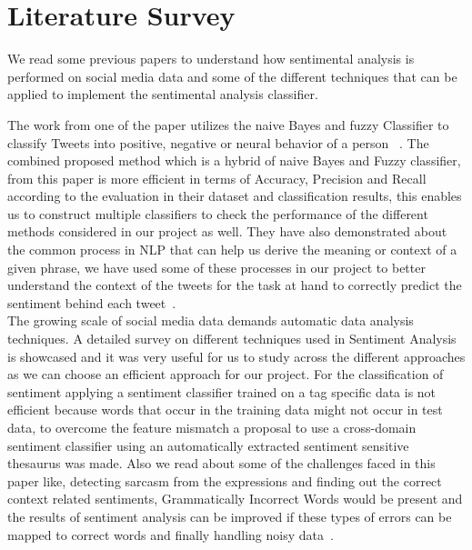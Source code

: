 \section{Literature Survey}
We read some previous papers to understand how sentimental analysis is 
performed on social media data and some of the different techniques that can be 
applied to implement the sentimental analysis classifier.

The work from one of the paper utilizes the naive Bayes and fuzzy Classifier to 
classify Tweets into positive, negative or neural behavior of a person ~\cite{hid-sp18-418-fuzzy-naive}. 
The combined proposed method which is a hybrid of naive Bayes and Fuzzy classifier, 
from this paper is more efficient in terms of Accuracy, Precision and Recall according 
to the evaluation in their dataset and classification results, this enables us to construct 
multiple classifiers to check the performance of the different methods 
considered in our project as well. They have also demonstrated about the common 
process in NLP that can help us derive the meaning or context of a given phrase, 
we have used some of these processes in our project to better understand the 
context of the tweets for the task at hand to correctly predict the sentiment 
behind each tweet~\cite{hid-sp18-418-fuzzy-naive}.\\ 
 
The growing scale of social media data demands automatic data analysis techniques. 
A detailed survey on different techniques used in Sentiment Analysis is showcased 
and it was very useful for us to study across the different approaches as we can 
choose an efficient approach for our project. For the classification of sentiment 
applying a sentiment classifier trained on a tag specific data is not efficient 
because words that occur in the training data might not occur in test data, to 
overcome the feature mismatch a proposal to use a cross-domain sentiment classifier 
using an automatically extracted sentiment sensitive thesaurus was made. Also we 
read about some of the challenges faced in this paper like, detecting sarcasm from 
the expressions and finding out the correct context related sentiments, Grammatically 
Incorrect Words would be present and the results of sentiment analysis can be improved 
if these types of errors can be mapped to correct words and finally handling noisy 
data~\cite{hid-sp18-418-sentimental-analysis}. 


